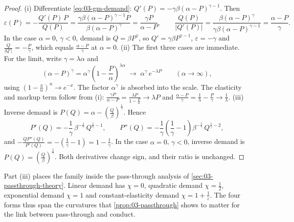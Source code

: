 \begin{proof}
(i) Differentiate \eqref{eq:03-gm-demand}: $Q'(P) = -\gamma\beta(\alpha - P)^{\gamma - 1}$. Then
\begin{equation*}
\varepsilon(P) = -\frac{Q'(P)\,P}{Q(P)} = \frac{\gamma\beta(\alpha - P)^{\gamma - 1} P}{\beta(\alpha - P)^{\gamma}}
= \frac{\gamma P}{\alpha - P},
\qquad
\frac{Q(P)}{\lvert Q'(P)\rvert} = \frac{\beta(\alpha - P)^{\gamma}}{\gamma\beta(\alpha - P)^{\gamma - 1}}
= \frac{\alpha - P}{\gamma}.
\end{equation*}
In the case $\alpha = 0$, $\gamma < 0$, demand is $Q = \beta P^{\gamma}$, so $Q' = \gamma\beta P^{\gamma - 1}$,
$\varepsilon = -\gamma$ and $\frac{Q}{\lvert Q'\rvert} = -\frac{P}{\gamma}$, which equals $\frac{\alpha - P}{\gamma}$ at
$\alpha = 0$.
(ii) The first three cases are immediate. For the limit, write $\gamma = \lambda\alpha$ and
\begin{equation*}
(\alpha - P)^{\gamma} = \alpha^{\gamma}\left(1 - \frac{P}{\alpha}\right)^{\lambda\alpha}
\;\longrightarrow\; \alpha^{\gamma}\, e^{-\lambda P}
\qquad (\alpha \to \infty),
\end{equation*}
using $\left(1 - \frac{x}{n}\right)^{n} \to e^{-x}$. The factor $\alpha^{\gamma}$ is absorbed into the
scale. The elasticity and markup term follow from (i):
$\frac{\gamma P}{\alpha - P} = \frac{\lambda P}{1 - \frac{P}{\alpha}} \to \lambda P$ and
$\frac{\alpha - P}{\gamma} = \frac{1}{\lambda} - \frac{P}{\gamma} \to \frac{1}{\lambda}$.
(iii) Inverse demand is $P(Q) = \alpha - \left(\frac{Q}{\beta}\right)^{\frac{1}{\gamma}}$. Hence
\begin{equation*}
P'(Q) = -\frac{1}{\gamma}\,\beta^{-\frac{1}{\gamma}}\,Q^{\frac{1}{\gamma} - 1},
\qquad
P''(Q) = -\frac{1}{\gamma}\left(\frac{1}{\gamma} - 1\right)\beta^{-\frac{1}{\gamma}}\,Q^{\frac{1}{\gamma} - 2},
\end{equation*}
and $-\frac{QP''(Q)}{P'(Q)} = -\left(\frac{1}{\gamma} - 1\right) = 1 - \frac{1}{\gamma}$. In the case $\alpha = 0$,
$\gamma < 0$, inverse demand is $P(Q) = \left(\frac{Q}{\beta}\right)^{\frac{1}{\gamma}}$. Both derivatives change sign,
and their ratio is unchanged.
\end{proof}

Part (iii) places the family inside the pass-through analysis of \cref{sec:03-passthrough-theory}. Linear
demand has $\chi = 0$, quadratic demand $\chi = \frac{1}{2}$, exponential demand $\chi = 1$ and
constant-elasticity demand $\chi = 1 + \frac{1}{\varepsilon}$. The four forms thus span the curvatures that
\cref{prop:03-passthrough} shows to matter for the link between pass-through and conduct.

